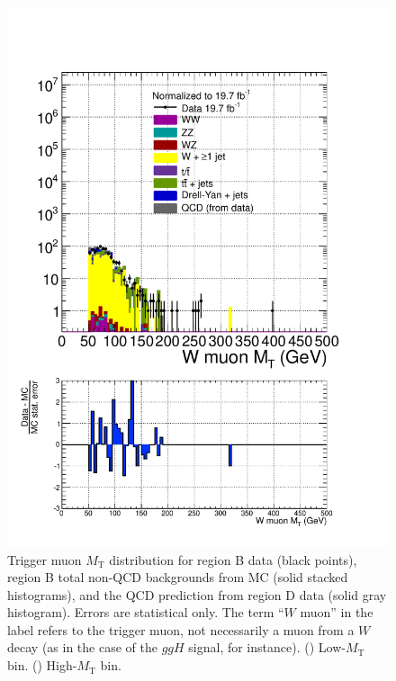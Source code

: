 \begin{figure}[hbtp]
\begin{center}
    \includegraphics[width=\cmsFigWidth]{figures/dataVsMCQCD_WMuMT_highMT_v87}
    \caption{Trigger muon $M_{\text{T}}$ distribution for region B data (black points), region B total non-QCD backgrounds from MC (solid stacked histograms), and the QCD prediction from region D data (solid gray histogram).  Errors are statistical only. The term ``$W$ muon'' in the label refers to the trigger muon, not necessarily a muon from a $W$ decay (as in the case of the $ggH$ signal, for instance).  (\cmsLeft) Low-$M_{\text{T}}$ bin. (\cmsRight) High-$M_{\text{T}}$ bin.}
    \label{fig:regB-data-MC-MT}
  \end{center}
\end{figure}

